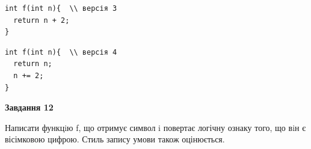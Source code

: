 \documentclass[12pt, ukrainian]{article}
\begin{document}
{\begin {large}
\begin{minipage}[t]{11.0cm}
\vspace{-8mm}\begin{verbatim}
int f(int n){  \\ версія 3
  return n + 2;
}
\end{verbatim}

\vspace{-8mm}\begin{verbatim}
int f(int n){  \\ версія 4
  return n;
  n += 2;
}
\end{verbatim}



\begin{center}
\textbf{Завдання 12}
\end{center}

Написати функцiю f, що отримує символ i повертає логічну ознаку того, що вiн є вісімковою цифрою. Стиль запису умови також оцінюється.\par

\end{minipage}

\end {large}}
\newpage
\end{document}
